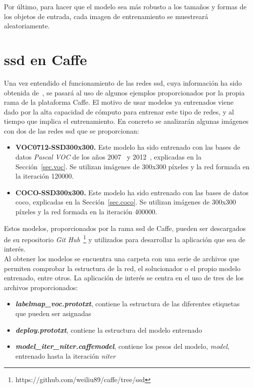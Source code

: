 Por último, para hacer que el modelo sea más robusto a los tamaños y formas de los objetos de entrada, cada imagen de entrenamiento se muestreará aleatoriamente.

\section{\acrshort{ssd} en Caffe}
Una vez entendido el funcionamiento de las redes \acrshort{ssd}, cuya información ha sido obtenida de~\cite{2015arXiv151202325L}, se pasará al uso de algunos ejemplos proporcionados por la propia rama de la plataforma Caffe. El motivo de usar modelos ya entrenados viene dado por la alta capacidad de cómputo para entrenar este tipo de redes, y al tiempo que implica el entrenamiento. En concreto se analizarán algunas imágenes con dos de las redes \acrshort{ssd} que se proporcionan:
\begin{itemize}
	\item \textbf{VOC0712-SSD300x300.} Este modelo ha sido entrenado con las bases de datos \textit{Pascal VOC} de los años 2007~\cite{pascal-voc-2007} y 2012~\cite{pascal-voc-2012}, explicadas en la Sección~\ref{sec.voc}. Se utilizan imágenes de 300x300 píxeles y la red formada en la iteración 120000.
	\item \textbf{COCO-SSD300x300.} Este modelo ha sido entrenado con las bases de datos \acrshort{coco}, explicadas en la Sección~\ref{sec.coco}. Se utilizan imágenes de 300x300 píxeles y la red formada en la iteración 400000.
\end{itemize}

Estos modelos, proporcionados por la rama \acrshort{ssd} de Caffe, pueden ser descargados de su repositorio \textit{Git Hub}~\footnote{https://github.com/weiliu89/caffe/tree/ssd} y utilizados para desarrollar la aplicación que sea de interés.\\

Al obtener los modelos se encuentra una carpeta con una serie de archivos que permiten comprobar la estructura de la red, el solucionador o el propio modelo entrenado, entre otros. La aplicación de interés se centra en el uso de tres de los archivos proporcionados:
\begin{itemize}
	\item \textbf{\textit{labelmap\_voc.prototxt}}, contiene la estructura de las diferentes etiquetas que pueden ser asignadas
	\item \textbf{\textit{deploy.prototxt}}, contiene la estructura del modelo entrenado
	\item \textbf{\textit{model\_iter\_niter.caffemodel}}, contiene los pesos del modelo, \textit{model}, entrenado hasta la iteración \textit{niter}
\end{itemize}

